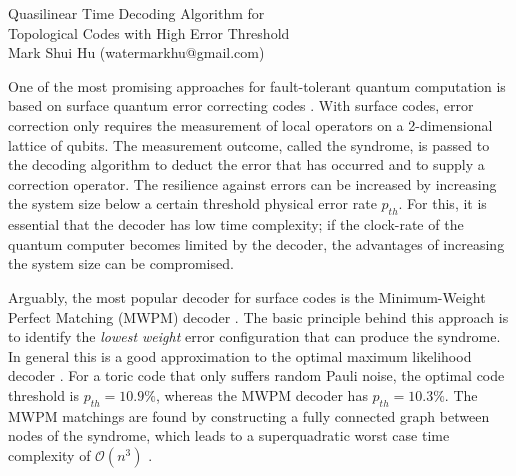\documentclass[10pt, a4paper, twoside, titlepage, usenames,dvipsnames]{report}
\begin{document}
\begingroup
    \centering
    \Large Quasilinear Time Decoding Algorithm for \\Topological Codes with High Error Threshold\\[.5em]
    \large Mark Shui Hu (watermarkhu@gmail.com)\par
\endgroup
\vspace{2em}
One of the most promising approaches for fault-tolerant quantum computation is based on surface quantum error correcting codes \cite{dennis2002topological, kitaev2003fault}. With surface codes, error correction only requires the measurement of local operators on a 2-dimensional lattice of qubits. The measurement outcome, called the syndrome, is passed to the decoding algorithm to deduct the error that has occurred and to supply a correction operator. 
The resilience against errors can be increased by increasing the system size below a certain threshold physical error rate $p_{th}$. For this, it is essential that the decoder has low time complexity; if the clock-rate of the quantum computer becomes limited by the decoder, the advantages of increasing the system size can be compromised.

Arguably, the most popular decoder for surface codes is the Minimum-Weight Perfect Matching (MWPM) decoder \cite{dennis2002topological}. The basic principle behind this approach is to identify the \emph{lowest weight} error configuration that can produce the syndrome. In general this is a good approximation to the optimal maximum likelihood decoder \cite{}. For a toric code that only suffers random Pauli noise, the optimal code threshold is $p_{th} = 10.9\%$, whereas the MWPM decoder has $p_{th} = 10.3\%$. The MWPM matchings are found by constructing a fully connected graph between nodes of the syndrome, which leads to a superquadratic worst case time complexity of $\mathcal{O}(n^3)$ \cite{kolmogorov2009blossom}.
\end{document}
